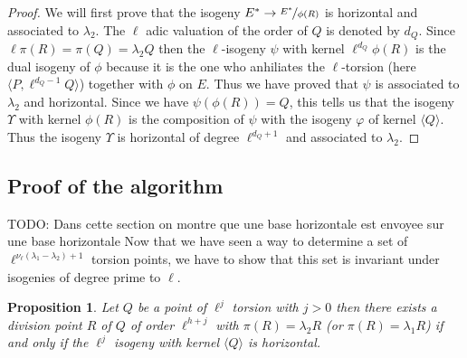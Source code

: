 \documentclass{article}
\newcommand{\todo}[1]{{\color{red}TODO: #1}}
\theoremstyle{plain}
\newtheorem{prop}[thm]{Proposition}
\theoremstyle{definition}
\theoremstyle{remark}
\begin{document}
\begin{proof}
We will first prove that the isogeny $E^* \rightarrow \nicefrac{E^*}{\phi(R)}$ is horizontal and associated to $\lambda_2$.
\newline
The $\ell$ adic valuation of the order of $Q$ is denoted by $d_Q$. Since $\ell \pi(R)=\pi(Q)=\lambda_2Q$ then the $\ell$-isogeny $\psi$ with kernel $\ell^{d_Q}\phi(R)$ is the dual isogeny of $\phi$ because it is the one who anhiliates the $\ell$-torsion (here $\langle P, \ell^{d_Q-1}Q \rangle$) together with $\phi$ on $E$. Thus we have proved that $\psi$ is associated to $\lambda_2$ and horizontal. 
\newline
Since we have $\psi(\phi(R))=Q$, this tells us that the isogeny $\Upsilon$ with kernel $\phi(R)$ is the composition of $\psi$ with the isogeny $\varphi$ of kernel $\langle Q \rangle$. Thus the isogeny $\Upsilon$ is horizontal of degree $\ell^{d_Q+1}$ and associated to $\lambda_2$. 
\end{proof}


\subsection{Proof of the algorithm}
\todo{Dans cette section on montre que une base horizontale est envoyee sur une base horizontale}
Now that we have seen a way to determine a set of $\ell^{\nu_{\ell}(\lambda_1-\lambda_2)+1}$ torsion points, we have to show that this set is invariant under isogenies of degree prime to $\ell$.

\begin{prop}
Let $Q$ be a point of $\ell^j$ torsion with $j>0$ then there exists a division point $R$ of $Q$ of order $\ell^{h+j}$ with $\pi(R)=\lambda_2R$ (or $\pi(R)=\lambda_1R$) if and only if the $\ell^j$ isogeny with kernel $\langle Q \rangle $ is horizontal.
\end{prop}
\end{document}

